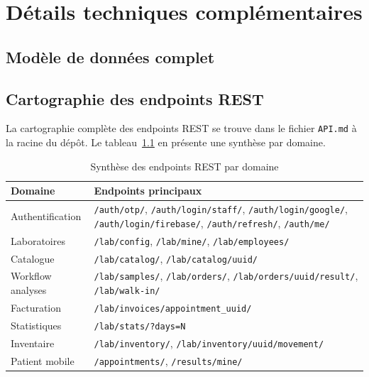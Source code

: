 \documentclass[12pt, a4paper, oneside]{report}
\begin{document}
\newpage

\appendix
\chapter{Détails techniques complémentaires}

\section{Modèle de données complet}

\section{Cartographie des endpoints REST}
La cartographie complète des endpoints REST se trouve dans le fichier
\texttt{API.md} à la racine du dépôt. Le tableau~\ref{tab:endpoints}
en présente une synthèse par domaine.

\begin{table}[ht]
  \centering
  \caption{Synthèse des endpoints REST par domaine}
  \label{tab:endpoints}
  \small
  \begin{tabularx}{\linewidth}{l X}
    \toprule
    \textbf{Domaine} & \textbf{Endpoints principaux} \\
    \midrule
    Authentification & \texttt{/auth/otp/}, \texttt{/auth/login/staff/}, \texttt{/auth/login/google/}, \texttt{/auth/login/firebase/}, \texttt{/auth/refresh/}, \texttt{/auth/me/} \\
    Laboratoires & \texttt{/lab/config}, \texttt{/lab/mine/}, \texttt{/lab/employees/} \\
    Catalogue & \texttt{/lab/catalog/}, \texttt{/lab/catalog/{uuid}/} \\
    Workflow analyses & \texttt{/lab/samples/}, \texttt{/lab/orders/}, \texttt{/lab/orders/{uuid}/result/}, \texttt{/lab/walk-in/} \\
    Facturation & \texttt{/lab/invoices/{appointment\_uuid}/} \\
    Statistiques & \texttt{/lab/stats/?days=N} \\
    Inventaire & \texttt{/lab/inventory/}, \texttt{/lab/inventory/{uuid}/movement/} \\
    Patient mobile & \texttt{/appointments/}, \texttt{/results/mine/} \\
    \bottomrule
  \end{tabularx}
\end{table}
\end{document}
